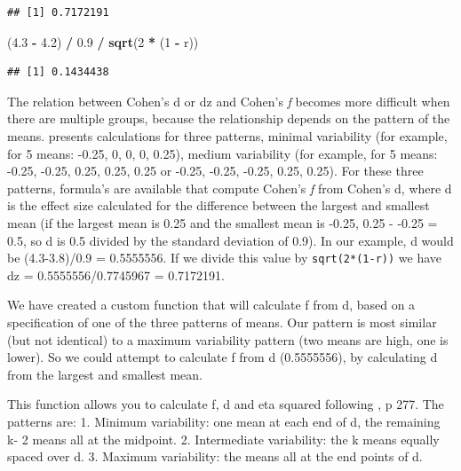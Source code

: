 \documentclass[
]{book}
\newenvironment{Shaded}{\begin{snugshade}}{\end{snugshade}}
\newcommand{\DecValTok}[1]{\textcolor[rgb]{0.00,0.00,0.81}{#1}}
\newcommand{\FloatTok}[1]{\textcolor[rgb]{0.00,0.00,0.81}{#1}}
\newcommand{\KeywordTok}[1]{\textcolor[rgb]{0.13,0.29,0.53}{\textbf{#1}}}
\newcommand{\NormalTok}[1]{#1}
\newcommand{\OperatorTok}[1]{\textcolor[rgb]{0.81,0.36,0.00}{\textbf{#1}}}
\newcommand{\StringTok}[1]{\textcolor[rgb]{0.31,0.60,0.02}{#1}}
\begin{document}
\begin{verbatim}
## [1] 0.7172191
\end{verbatim}

\begin{Shaded}
\begin{Highlighting}[]
\NormalTok{  (}\FloatTok{4.3} \OperatorTok{-}\StringTok{ }\FloatTok{4.2}\NormalTok{) }\OperatorTok{/}\StringTok{ }\FloatTok{0.9} \OperatorTok{/}\StringTok{ }\KeywordTok{sqrt}\NormalTok{(}\DecValTok{2} \OperatorTok{*}\StringTok{ }\NormalTok{(}\DecValTok{1} \OperatorTok{-}\StringTok{ }\NormalTok{r))}
\end{Highlighting}
\end{Shaded}

\begin{verbatim}
## [1] 0.1434438
\end{verbatim}

The relation between Cohen's d or dz and Cohen's \emph{f} becomes more difficult when there are multiple groups, because the relationship depends on the pattern of the means. \citet{cohen1988spa} presents calculations for three patterns, minimal variability (for example, for 5 means: -0.25, 0, 0, 0, 0.25), medium variability (for example, for 5 means: -0.25, -0.25, 0.25, 0.25, 0.25 or -0.25, -0.25, -0.25, 0.25, 0.25). For these three patterns, formula's are available that compute Cohen's \emph{f} from Cohen's d, where d is the effect size calculated for the difference between the largest and smallest mean (if the largest mean is 0.25 and the smallest mean is -0.25, 0.25 - -0.25 = 0.5, so d is 0.5 divided by the standard deviation of 0.9). In our example, d would be (4.3-3.8)/0.9 = 0.5555556. If we divide this value by \texttt{sqrt(2*(1-r))} we have dz = 0.5555556/0.7745967 = 0.7172191.

We have created a custom function that will calculate f from d, based on a specification of one of the three patterns of means. Our pattern is most similar (but not identical) to a maximum variability pattern (two means are high, one is lower). So we could attempt to calculate f from d (0.5555556), by calculating d from the largest and smallest mean.

This function allows you to calculate f, d and eta squared
following \citet{cohen1988spa}, p 277. The patterns are:
1. Minimum variability: one mean at each end of d, the remaining k- 2 means all at the midpoint.
2. Intermediate variability: the k means equally spaced over d.
3. Maximum variability: the means all at the end points of d.
\end{document}

